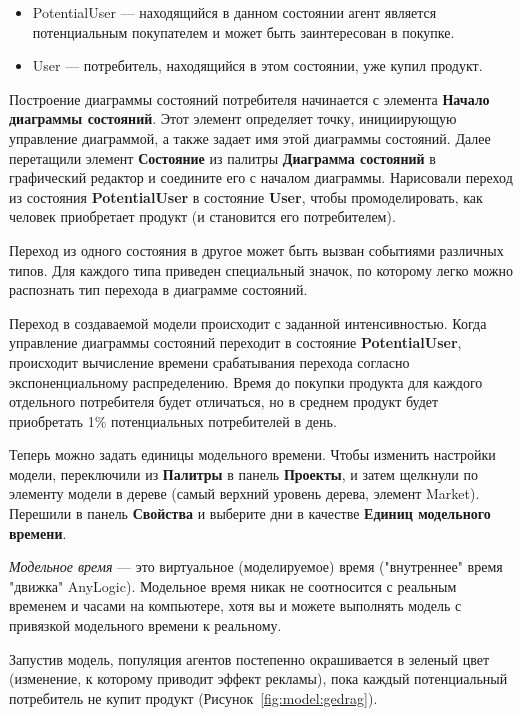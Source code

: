 \begin{itemize}
	\item PotentialUser --- находящийся в данном состоянии агент является
		потенциальным покупателем и может быть заинтересован в покупке.
	\item User --- потребитель, находящийся в этом состоянии,
		уже купил продукт.
\end{itemize}

Построение диаграммы состояний потребителя начинается с элемента
\textbf{Начало диаграммы состояний}.
Этот элемент определяет точку, инициирующую управление диаграммой, а
также задает имя этой диаграммы состояний.
Далее перетащили элемент \textbf{Состояние} из палитры
\textbf{Диаграмма состояний} в графический редактор и соедините
его с началом диаграммы. Нарисовали переход из состояния
\textbf{PotentialUser} в состояние \textbf{User}, чтобы промоделировать,
как человек приобретает продукт (и становится его потребителем).\par
Переход из одного состояния в другое может быть вызван событиями различных
типов. Для каждого типа приведен специальный значок, по которому легко
можно распознать тип перехода в диаграмме состояний.\par
Переход в создаваемой модели происходит с заданной интенсивностью.
Когда управление диаграммы состояний переходит в состояние
\textbf{PotentialUser}, происходит вычисление времени срабатывания перехода
согласно экспоненциальному распределению. Время до покупки продукта
для каждого отдельного потребителя будет отличаться, но в среднем
продукт будет приобретать 1\% потенциальных потребителей в день.\par
Теперь можно задать единицы модельного времени. Чтобы изменить
настройки модели, переключили из \textbf{Палитры} в панель \textbf{Проекты},
и затем щелкнули по элементу модели в дереве (самый верхний уровень дерева,
элемент Market). Перешили в панель \textbf{Свойства} и выберите дни в
качестве \textbf{Единиц модельного времени}.\par
\textit{Модельное время} --- это виртуальное (моделируемое) время
("внутреннее" время "движка" AnyLogic). Модельное время никак не
соотносится с реальным временем и часами на компьютере, хотя вы и
можете выполнять модель с привязкой модельного времени к
реальному.\par
Запустив модель, популяция агентов постепенно окрашивается в зеленый
цвет (изменение, к которому приводит эффект рекламы), пока каждый
потенциальный потребитель не купит продукт (Рисунок~\ref{fig:model:gedrag}).


